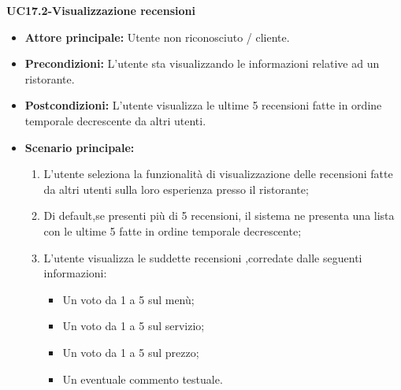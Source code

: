 \textbf{UC17.2-Visualizzazione recensioni}
\begin{itemize}
\item \textbf{Attore principale:} Utente non riconosciuto / cliente.
\item \textbf{Precondizioni:} L'utente sta visualizzando le informazioni relative ad un ristorante.
\item \textbf{Postcondizioni:} L'utente visualizza le ultime 5 recensioni fatte in ordine temporale decrescente da altri utenti.
\item \textbf{Scenario principale:}
\begin{enumerate}
    \item L'utente seleziona la funzionalità di visualizzazione delle recensioni fatte da altri utenti
    sulla loro esperienza presso il ristorante;
    \item Di default,se presenti più di 5 recensioni, il sistema ne presenta una lista con le ultime 5 fatte in ordine temporale decrescente;
    \item L'utente visualizza le suddette recensioni ,corredate dalle seguenti informazioni:
    \begin{itemize}
        \item Un voto da 1 a 5 sul menù;
        \item Un voto da 1 a 5 sul servizio;
        \item Un voto da 1 a 5 sul prezzo;
        \item Un eventuale commento testuale.
    \end{itemize}
\end{enumerate}
\end{itemize}

